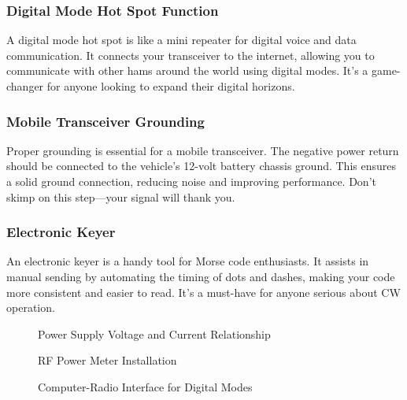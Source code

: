 \subsubsection*{Digital Mode Hot Spot Function}
A digital mode hot spot is like a mini repeater for digital voice and data communication. It connects your transceiver to the internet, allowing you to communicate with other hams around the world using digital modes. It's a game-changer for anyone looking to expand their digital horizons.

\subsubsection*{Mobile Transceiver Grounding}
Proper grounding is essential for a mobile transceiver. The negative power return should be connected to the vehicle's 12-volt battery chassis ground. This ensures a solid ground connection, reducing noise and improving performance. Don't skimp on this step—your signal will thank you.

\subsubsection*{Electronic Keyer}
An electronic keyer is a handy tool for Morse code enthusiasts. It assists in manual sending by automating the timing of dots and dashes, making your code more consistent and easier to read. It's a must-have for anyone serious about CW operation.

\begin{figure}[h!]
    \centering
    \caption{Power Supply Voltage and Current Relationship}
    \label{fig:power-supply-relationship}
\end{figure}

\begin{figure}[h!]
    \centering
    \caption{RF Power Meter Installation}
    \label{fig:rf-power-meter-installation}
\end{figure}

\begin{figure}[h!]
    \centering
    \caption{Computer-Radio Interface for Digital Modes}
    \label{fig:computer-radio-interface}
\end{figure}

